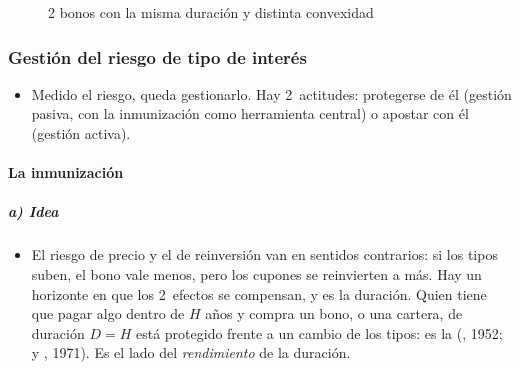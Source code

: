 \documentclass[11pt]{article}
\begin{document}
\begin{figure}[H]
\centering
\caption{2 bonos con la misma duración y distinta convexidad}\label{fig:convexidad-bonos}
\end{figure}

\subsubsection{Gestión del riesgo de tipo de interés}\label{sec:gestion}

\begin{itemize}
\item Medido el riesgo, queda gestionarlo. Hay 2~actitudes: protegerse de él (gestión pasiva, con la inmunización como herramienta central) o apostar con él (gestión activa).
\end{itemize}

\paragraph{La inmunización}\label{sec:inmunizacion}

\subparagraph{a) Idea}
\begin{itemize}
\item El riesgo de precio y el de reinversión van en sentidos contrarios: si los tipos suben, el bono vale menos, pero los cupones se reinvierten a más. Hay un horizonte en que los 2~efectos se compensan, y es la duración. Quien tiene que pagar algo dentro de $H$ años y compra un bono, o una cartera, de duración $D=H$ está protegido frente a un cambio de los tipos: es la  (, 1952;  y , 1971)\nocite{Redington1952Review,FisherWeil1971Coping}. Es el lado del \emph{rendimiento} de la duración.
\end{itemize}
\end{document}
